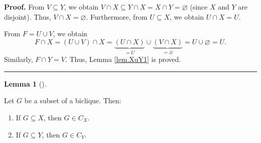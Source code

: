 \documentclass[numbers=enddot,12pt,final,onecolumn,notitlepage]{scrartcl}%
\theoremstyle{definition}
\newtheorem{lem}[theo]{Lemma}
\newenvironment{lemma}[1][]
{\begin{lem}[#1]\begin{leftbar}}
{\end{leftbar}\end{lem}}
\newenvironment{proof}[1][Proof]{\noindent\textbf{#1.} }{\ \rule{0.5em}{0.5em}}
\newenvironment{verlong}{}{}
\begin{document}
\begin{verlong}


\begin{proof}
From $V\subseteq Y$, we obtain $V\cap X\subseteq Y\cap X=X\cap Y=\varnothing$
(since $X$ and $Y$ are disjoint). Thus, $V\cap X=\varnothing$. Furthermore,
from $U\subseteq X$, we obtain $U\cap X=U$.

From $F=U\cup V$, we obtain%
\[
F\cap X=\left(  U\cup V\right)  \cap X=\underbrace{\left(  U\cap X\right)
}_{=U}\cup\underbrace{\left(  V\cap X\right)  }_{=\varnothing}=U\cup
\varnothing=U.
\]
Similarly, $F\cap Y=V$. Thus, Lemma \ref{lem.XuY1} is proved.
\end{proof}
\end{verlong}

\begin{lemma}
\label{lem.biclique.XY}Let $G$ be a subset of a biclique. Then:

\begin{enumerate}
\item[\textbf{(a)}] If $G\subseteq X$, then $G\in C_{X}$.

\item[\textbf{(b)}] If $G\subseteq Y$, then $G\in C_{Y}$.
\end{enumerate}
\end{lemma}
\end{document}
